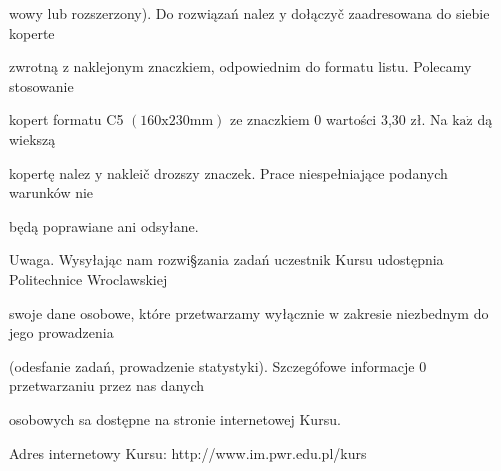 \documentclass[a4paper,12pt]{article}
\begin{document}
wowy lub rozszerzony). Do rozwiązań nalez $\mathrm{y}$ dołączyč zaadresowana do siebie koperte

zwrotną $\mathrm{z}$ naklejonym znaczkiem, odpowiednim do formatu listu. Polecamy stosowanie

kopert formatu C5 $(160\mathrm{x}230\mathrm{m}\mathrm{m})$ ze znaczkiem $0$ wartości 3,30 zł. Na $\mathrm{k}\mathrm{a}\dot{\mathrm{z}}$ dą wiekszą

kopertę nalez $\mathrm{y}$ nakleič drozszy znaczek. Prace niespełniające podanych warunków nie

będą poprawiane ani odsyłane.

Uwaga. Wysyłając nam rozwi\S zania zadań uczestnik Kursu udostępnia Politechnice Wroclawskiej

swoje dane osobowe, które przetwarzamy wyłącznie $\mathrm{w}$ zakresie niezbednym do jego prowadzenia

(odesfanie zadań, prowadzenie statystyki). Szczegófowe informacje $0$ przetwarzaniu przez nas danych

osobowych sa dostępne na stronie internetowej Kursu.

Adres internetowy Kursu: http://www.im.pwr.edu.pl/kurs
\end{document}
